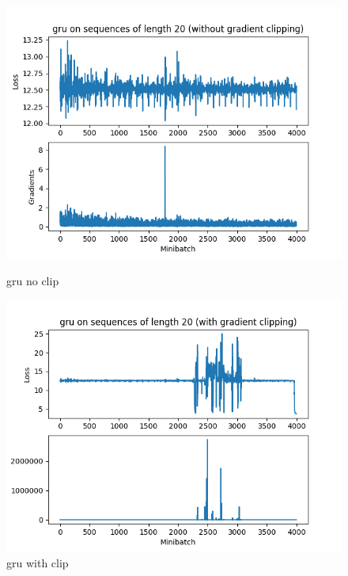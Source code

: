 \documentclass{article}[11pt]
\begin{document}
\begin{enumerate}[(a)]
\begin{figure}[H]
\begin{minipage}{0.5\linewidth}
\begin{center}
        \includegraphics[width=\linewidth]{../assignment3/q3-noclip-gru.png}
        \caption{gru no clip}
      \end{center}
    \end{minipage}
    \begin{minipage}{0.5\linewidth}
      \begin{center}
        \includegraphics[width=\linewidth]{../assignment3/q3-clip-gru.png}
        \caption{gru with clip}
      \end{center}
    \end{minipage}
  \end{figure}
\end{enumerate}
\end{document}
